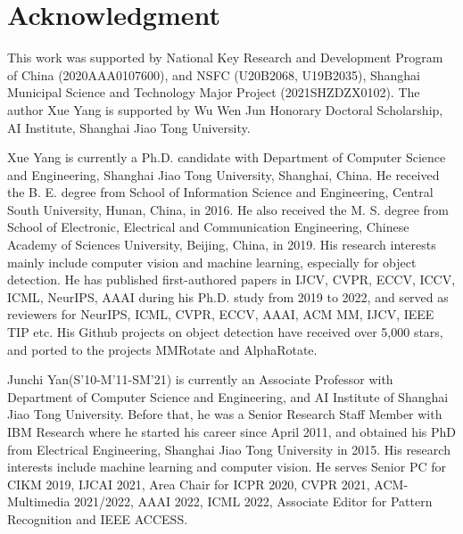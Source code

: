 \documentclass[10pt,journal,compsoc]{IEEEtran}
\begin{document}
\section*{Acknowledgment}
This work was supported by National Key Research and Development Program of China (2020AAA0107600), and NSFC (U20B2068, U19B2035), Shanghai Municipal Science and Technology Major Project (2021SHZDZX0102). The author Xue Yang is supported by Wu Wen Jun Honorary Doctoral Scholarship, AI Institute, Shanghai Jiao Tong University. 

\ifCLASSOPTIONcaptionsoff
  \newpage
\fi






\begin{IEEEbiography}{Xue Yang} is currently a Ph.D. candidate with Department of Computer Science and Engineering, Shanghai Jiao Tong University, Shanghai, China. He received the B. E. degree from School of Information Science and Engineering, Central South University, Hunan, China, in 2016. He also received the M. S. degree from School of Electronic, Electrical and Communication Engineering, Chinese Academy of Sciences University, Beijing, China, in 2019. His research interests mainly include computer vision and machine learning, especially for object detection. He has published first-authored papers in IJCV, CVPR, ECCV, ICCV, ICML, NeurIPS, AAAI during his Ph.D. study from 2019 to 2022, and served as reviewers for NeurIPS, ICML, CVPR, ECCV, AAAI, ACM MM, IJCV, IEEE TIP etc. His Github projects on object detection have received over 5,000 stars, and ported to the projects MMRotate and AlphaRotate.

\end{IEEEbiography}
\begin{IEEEbiography}{Junchi Yan}(S'10-M'11-SM'21) is currently an Associate Professor with Department of Computer Science and Engineering, and AI Institute of Shanghai Jiao Tong University. Before that, he was a Senior Research Staff Member with IBM Research where he started his career since April 2011, and obtained his PhD from Electrical Engineering, Shanghai Jiao Tong University in 2015. His research interests include machine learning and computer vision. He serves Senior PC for CIKM 2019, IJCAI 2021, Area Chair for ICPR 2020, CVPR 2021, ACM-Multimedia 2021/2022, AAAI 2022, ICML 2022, Associate Editor for Pattern Recognition and IEEE ACCESS.
\end{IEEEbiography}
\end{document}
